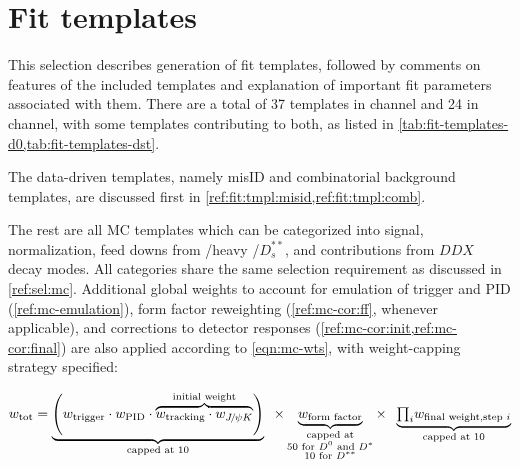 \section{Fit templates}
\label{ref:fit:tmpl}

This selection describes generation of fit templates, followed by comments on
features of the included templates and explanation of important fit parameters
associated with them.
There are a total of 37 templates in \Dz channel and 24 in \Dstar channel,
with some templates contributing to both, as listed in
\cref{tab:fit-templates-d0,tab:fit-templates-dst}.

The data-driven templates,
namely \muon misID and combinatorial background templates,
are discussed first in \cref{ref:fit:tmpl:misid,ref:fit:tmpl:comb}.

The rest are all MC templates which can be categorized into signal,
normalization, feed downs from \Dstst/heavy \Dstst/$D^{**}_s$, and contributions
from $DDX$ decay modes.
All categories share the same selection requirement as discussed in
\cref{ref:sel:mc}.
Additional global weights to account for emulation of trigger and PID
(\cref{ref:mc-emulation}),
form factor reweighting (\cref{ref:mc-cor:ff}, whenever applicable),
and corrections to detector responses (\cref{ref:mc-cor:init,ref:mc-cor:final})
are also applied according to \cref{eqn:mc-wts},
with weight-capping strategy specified:

\begin{equation}
    w_\text{tot} = \underbrace{\left(
            w_\text{trigger} \cdot w_\text{PID} \cdot
            \overbrace{
                w_\text{tracking} \cdot w_{\jpsi\kaon}
            }^\text{initial weight}
        \right)}_\text{capped at 10} \;\; \times
        \underbrace{w_\text{form factor}}_{\substack{
            \text{capped at} \\
            \text{50 for \Dz and \Dstar} \\
            \text{10 for $D^{**}$}
        }} \times \;\;
        \underbrace{
            {\textstyle\prod_i} w_\text{final weight,step $i$}
        }_\text{capped at 10}
        \label{eqn:mc-wts}
\end{equation}


